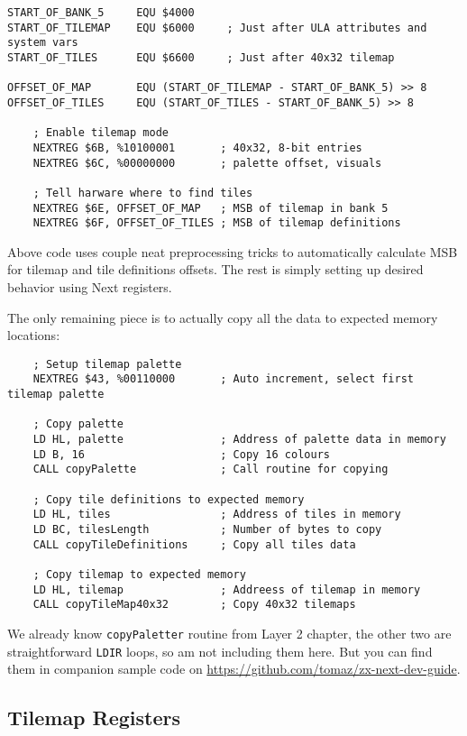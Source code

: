 \documentclass[12pt,twoside,openright,a4paper]{book}
\begin{document}
\begin{Verbatim}
START_OF_BANK_5     EQU $4000
START_OF_TILEMAP    EQU $6000     ; Just after ULA attributes and system vars
START_OF_TILES      EQU $6600     ; Just after 40x32 tilemap

OFFSET_OF_MAP       EQU (START_OF_TILEMAP - START_OF_BANK_5) >> 8
OFFSET_OF_TILES     EQU (START_OF_TILES - START_OF_BANK_5) >> 8

	; Enable tilemap mode
	NEXTREG $6B, %10100001       ; 40x32, 8-bit entries
	NEXTREG $6C, %00000000       ; palette offset, visuals

	; Tell harware where to find tiles
	NEXTREG $6E, OFFSET_OF_MAP   ; MSB of tilemap in bank 5
	NEXTREG $6F, OFFSET_OF_TILES ; MSB of tilemap definitions
\end{Verbatim}

Above code uses couple neat preprocessing tricks to automatically calculate MSB for tilemap and tile definitions offsets. The rest is simply setting up desired behavior using Next registers.

The only remaining piece is to actually copy all the data to expected memory locations:

\begin{Verbatim}
	; Setup tilemap palette
	NEXTREG $43, %00110000       ; Auto increment, select first tilemap palette

	; Copy palette
	LD HL, palette               ; Address of palette data in memory
	LD B, 16                     ; Copy 16 colours
	CALL copyPalette             ; Call routine for copying

	; Copy tile definitions to expected memory
	LD HL, tiles                 ; Address of tiles in memory
	LD BC, tilesLength           ; Number of bytes to copy
	CALL copyTileDefinitions     ; Copy all tiles data

	; Copy tilemap to expected memory
	LD HL, tilemap               ; Addreess of tilemap in memory
	CALL copyTileMap40x32        ; Copy 40x32 tilemaps
\end{Verbatim}

We already know {\tt copyPaletter} routine from Layer 2 chapter, the other two are straightforward {\tt LDIR} loops, so am not including them here. But you can find them in companion sample code on \url{https://github.com/tomaz/zx-next-dev-guide}.


\subsection{Tilemap Registers}
\label{zx_next_tileset_registers}
\end{document}

